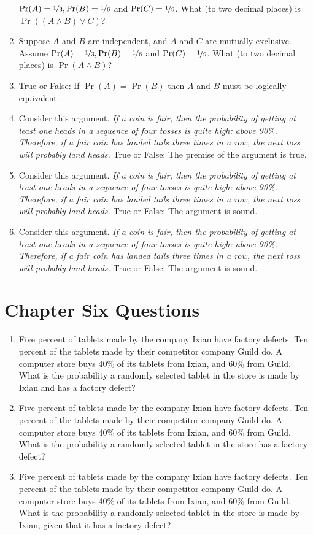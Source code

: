 \documentclass[
  11pt,
]{article}
\providecommand{\tightlist}{%
  \setlength{\itemsep}{0pt}\setlength{\parskip}{0pt}}
\begin{document}
\begin{enumerate}
  \(\Pr(A) = \nicefrac{1}{3}, \Pr(B) = \nicefrac{1}{6}\) and
  \(\Pr(C) = \nicefrac{1}{9}\). What (to two decimal places) is
  \(\Pr((A \wedge B) \vee C)\)?
\item
  Suppose \(A\) and \(B\) are independent, and \(A\) and \(C\) are
  mutually exclusive. Assume
  \(\Pr(A) = \nicefrac{1}{3}, \Pr(B) = \nicefrac{1}{6}\) and
  \(\Pr(C) = \nicefrac{1}{9}\). What (to two decimal places) is
  \(\Pr(A \wedge B)\)?
\item
  True or False: If \(\Pr(A) = \Pr(B)\) then \(A\) and \(B\) must be
  logically equivalent.
\item
  Consider this argument. \emph{If a coin is fair, then the probability
  of getting at least one heads in a sequence of four tosses is quite
  high: above 90\%. Therefore, if a fair coin has landed tails three
  times in a row, the next toss will probably land heads.} True or
  False: The premise of the argument is true.
\item
  Consider this argument. \emph{If a coin is fair, then the probability
  of getting at least one heads in a sequence of four tosses is quite
  high: above 90\%. Therefore, if a fair coin has landed tails three
  times in a row, the next toss will probably land heads.} True or
  False: The argument is sound.
\item
  Consider this argument. \emph{If a coin is fair, then the probability
  of getting at least one heads in a sequence of four tosses is quite
  high: above 90\%. Therefore, if a fair coin has landed tails three
  times in a row, the next toss will probably land heads.} True or
  False: The argument is sound.
\end{enumerate}

\hypertarget{chapter-six-questions}{%
\section{Chapter Six Questions}\label{chapter-six-questions}}

\begin{enumerate}
\def\labelenumi{\arabic{enumi}.}
\setcounter{enumi}{16}
\tightlist
\item
  Five percent of tablets made by the company Ixian have factory
  defects. Ten percent of the tablets made by their competitor company
  Guild do. A computer store buys 40\% of its tablets from Ixian, and
  60\% from Guild. What is the probability a randomly selected tablet in
  the store is made by Ixian and has a factory defect?
\item
  Five percent of tablets made by the company Ixian have factory
  defects. Ten percent of the tablets made by their competitor company
  Guild do. A computer store buys 40\% of its tablets from Ixian, and
  60\% from Guild. What is the probability a randomly selected tablet in
  the store has a factory defect?
\item
  Five percent of tablets made by the company Ixian have factory
  defects. Ten percent of the tablets made by their competitor company
  Guild do. A computer store buys 40\% of its tablets from Ixian, and
  60\% from Guild. What is the probability a randomly selected tablet in
  the store is made by Ixian, given that it has a factory defect?
\end{enumerate}
\end{document}
